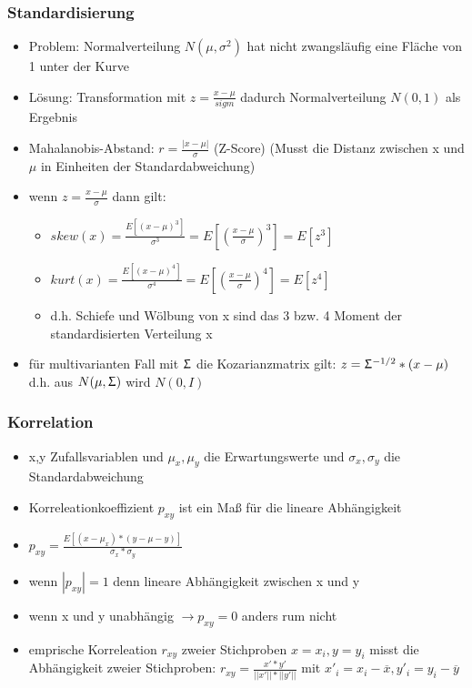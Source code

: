 \documentclass{article} %
\begin{document}
		\subsubsection{Standardisierung}
		\begin{itemize}
			\item Problem: Normalverteilung $N(\mu,\sigma^2)$ hat nicht zwangsläufig eine Fläche von 1 unter der Kurve
			\item Lösung: Transformation mit $z = \frac{x-\mu}{sigm}$ dadurch Normalverteilung $N(0,1)$ als Ergebnis
			\item Mahalanobis-Abstand: $r=\frac{|x-\mu|}{\sigma}$ (Z-Score) (Musst die Distanz zwischen x und $\mu$ in Einheiten der Standardabweichung)
			\item wenn $z=\frac{x-\mu}{\sigma}$ dann gilt:
			\begin{itemize}
				\item $skew(x) = \frac{E[(x-\mu)^3]}{\sigma^3} = E[(\frac{x-\mu}{\sigma})^3]  = E[z^3]$
				\item $kurt(x) = \frac{E[(x-\mu)^4]}{\sigma^4} = E[(\frac{x-\mu}{\sigma})^4]  = E[z^4]$
				\item d.h. Schiefe und Wölbung von x sind das 3 bzw. 4 Moment der standardisierten Verteilung x
			\end{itemize}
			\item für multivarianten Fall mit $\Upsigma$ die Kozarianzmatrix gilt: $z=\Upsigma^{-1/2}*(x-\mu)$ d.h. aus $N(\mu,\Upsigma)$ wird $N(0,I)$
		\end{itemize}
		\subsubsection{Korrelation}
		\begin{itemize}
			\item x,y Zufallsvariablen und $\mu_x,\mu_y$ die Erwartungswerte und $\sigma_x,\sigma_y$ die Standardabweichung
			\item Korreleationkoeffizient $p_{xy}$ ist ein Maß für die lineare Abhängigkeit
			\item $p_{xy} = \frac{E[(x-\mu_x)*(y-\mu-y)]}{\sigma_x*\sigma_y}$
			\item wenn $|p_{xy}| = 1$ denn lineare Abhängigkeit zwischen x und y
			\item wenn x und y unabhängig $\rightarrow p_{xy} = 0$ anders rum nicht
			\item emprische Korreleation $r_{xy}$ zweier Stichproben $x=x_i,y=y_i$ misst die Abhängigkeit zweier Stichproben: $r_{xy} = \frac{x'*y'}{||x'||*||y'||}$ mit $x'_i = x_i-\overline{x},y'_i=y_i-\overline{y}$
		\end{itemize}
\end{document}
